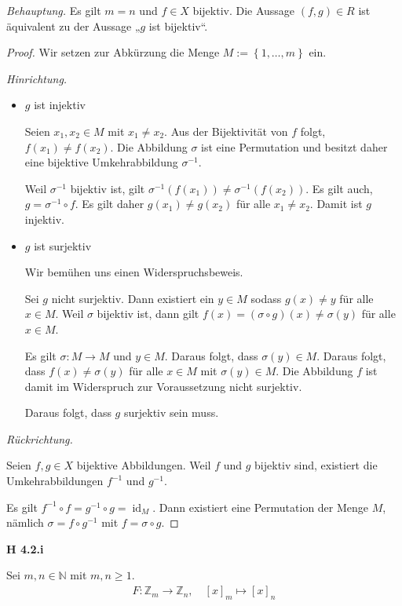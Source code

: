 \documentclass[12pt]{extarticle}
\newcommand{\idf}{\operatorname{id}}
\begin{document}
\textit{Behauptung.}  Es gilt \(m=n\) und \(f \in X\) bijektiv.  Die
Aussage \((f,g) \in R\) ist äquivalent zu der Aussage „\(g\) ist
bijektiv“.
\begin{proof}
  Wir setzen zur Abkürzung die Menge \(M:= \left\{ 1,\ldots,m \right\}\) ein.

\vspace{4mm}
\textit{Hinrichtung.}
  \begin{itemize}
  \item \(g\) ist injektiv

    Seien \(x_1, x_2 \in M\) mit \(x_1 \neq x_2\).  Aus der Bijektivität
    von \(f\) folgt, \(f(x_1) \neq f(x_2)\).  Die Abbildung \(\sigma\) ist
    eine Permutation und besitzt daher eine bijektive Umkehrabbildung
    \(\sigma^{-1}\).

    Weil \(\sigma^{-1}\) bijektiv ist, gilt
    \(\sigma^{-1}(f(x_1)) \neq \sigma^{-1}(f(x_2))\).  Es gilt auch,
    \(g=\sigma^{-1} \circ f\).  Es gilt daher \(g(x_1) \neq g(x_2)\) für
    alle \(x_1 \neq x_2\).  Damit ist \(g\) injektiv.

  \item \(g\) ist surjektiv

    Wir bemühen uns einen Widerspruchsbeweis.

    Sei \(g\) nicht surjektiv.  Dann existiert ein \(y \in M\) sodass
    \(g(x) \neq y\) für alle \(x \in M\).  Weil \(\sigma\) bijektiv ist,
    dann gilt \(f(x)=(\sigma \circ g)(x) \neq \sigma(y)\) für alle
    \(x \in M\).

    Es gilt \(\sigma: M \rightarrow M\) und \(y \in M\).  Daraus folgt,
    dass \(\sigma(y) \in M\).  Daraus folgt, dass \(f(x) \neq \sigma(y)\)
    für alle \(x \in M\) mit \(\sigma(y) \in M\).  Die Abbildung \(f\) ist
    damit im Widerspruch zur Voraussetzung nicht surjektiv.

    Daraus folgt, dass \(g\) surjektiv sein muss.
  \end{itemize}
\textit{Rückrichtung.}

  Seien \(f, g \in X\) bijektive Abbildungen.  Weil \(f\) und \(g\) bijektiv
  sind, existiert die Umkehrabbildungen \(f^{-1}\) und \(g^{-1}\).

  Es gilt \(f^{-1} \circ f = g^{-1} \circ g = \idf_M\).  Dann existiert
  eine Permutation der Menge \(M\), nämlich \(\sigma = f \circ g^{-1}\)
  mit \(f = \sigma \circ g\).
\end{proof}

\textbf{H 4.2.i}

Sei \(m, n \in \mathbb{N}\) mit \(m, n \geq 1\).
\begin{align*}
F: \mathbb{Z}_m\rightarrow\mathbb{Z}_n, \quad [x]_m\mapsto[x]_n
\end{align*}
\end{document}
